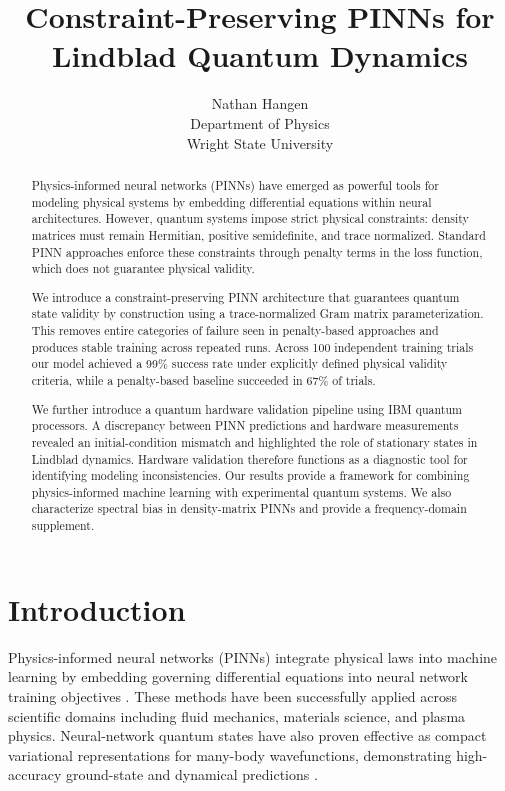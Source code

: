 \documentclass[11pt]{article}
\title{Constraint-Preserving PINNs for Lindblad Quantum Dynamics}
\author{Nathan Hangen \\ Department of Physics \\ Wright State University}
\date{}
\begin{document}
\maketitle

\begin{abstract}

Physics-informed neural networks (PINNs) have emerged as powerful tools for modeling physical systems by embedding differential equations within neural architectures.
However, quantum systems impose strict physical constraints: density matrices must remain Hermitian, positive semidefinite, and trace normalized. 
Standard PINN approaches enforce these constraints through penalty terms in the loss function, which does not guarantee physical validity.

We introduce a constraint-preserving PINN architecture that guarantees quantum state validity by construction using a trace-normalized Gram matrix parameterization. 
This removes entire categories of failure seen in penalty-based approaches and produces stable training across repeated runs. 
Across 100 independent training trials our model achieved a 99\% success rate under explicitly defined physical validity criteria, while a penalty-based baseline succeeded in 67\% of trials.

We further introduce a quantum hardware validation pipeline using IBM quantum processors. 
A discrepancy between PINN predictions and hardware measurements revealed an initial-condition mismatch and highlighted the role of stationary states in Lindblad dynamics. 
Hardware validation therefore functions as a diagnostic tool for identifying modeling inconsistencies. 
Our results provide a framework for combining physics-informed machine learning with experimental quantum systems.
We also characterize spectral bias in density-matrix PINNs and provide a frequency-domain supplement.

\end{abstract}

\section{Introduction}

Physics-informed neural networks (PINNs) integrate physical laws into machine learning by embedding governing differential equations into neural network training objectives \cite{raissi2019}. 
These methods have been successfully applied across scientific domains including fluid mechanics, materials science, and plasma physics.
Neural-network quantum states have also proven effective as compact variational representations for many-body wavefunctions, demonstrating high-accuracy ground-state and dynamical predictions \cite{carleo2016}.
\end{document}
